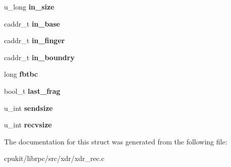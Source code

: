 \begin{DoxyCompactItemize}
u\+\_\+long {\bfseries in\+\_\+size}
\item 
\mbox{\label{structrec__strm_a719bbe93d3a5a72fdb18e4fbf6450cb5}} 
caddr\+\_\+t {\bfseries in\+\_\+base}
\item 
\mbox{\label{structrec__strm_ab096e1e7ecc19c685767c78341c99c84}} 
caddr\+\_\+t {\bfseries in\+\_\+finger}
\item 
\mbox{\label{structrec__strm_a4700c03291ae5fdc324c67ad885705c1}} 
caddr\+\_\+t {\bfseries in\+\_\+boundry}
\item 
\mbox{\label{structrec__strm_a363a8aecfce38a3ad7fd5b1cf62c03ac}} 
long {\bfseries fbtbc}
\item 
\mbox{\label{structrec__strm_a481f054af7c8aac168dc68d7c1dec15d}} 
bool\+\_\+t {\bfseries last\+\_\+frag}
\item 
\mbox{\label{structrec__strm_a5b535ba81a02a1e49fea0923bc925ce3}} 
u\+\_\+int {\bfseries sendsize}
\item 
\mbox{\label{structrec__strm_a124cd0699d268427899c12e1b401b068}} 
u\+\_\+int {\bfseries recvsize}
\end{DoxyCompactItemize}


The documentation for this struct was generated from the following file\+:\begin{DoxyCompactItemize}
\item 
cpukit/librpc/src/xdr/xdr\+\_\+rec.\+c\end{DoxyCompactItemize}
